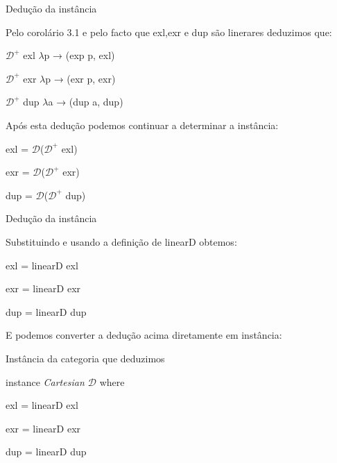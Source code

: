\documentclass{beamer}
\begin{document}
\begin{frame}{Dedução da instância}

Pelo corolário 3.1 e pelo facto que exl,exr e dup são linerares deduzimos que:

$\mathcal{D}^{+}$ exl $\lambda$p → (exp p, exl)

$\mathcal{D}^{+}$ exr $\lambda$p → (exr p, exr)

$\mathcal{D}^{+}$ dup $\lambda$a → (dup a, dup)

Após esta dedução podemos continuar a determinar a instância:

exl = $\mathcal{D}$($\mathcal{D}^{+}$ exl)

exr = $\mathcal{D}$($\mathcal{D}^{+}$ exr)

dup = $\mathcal{D}$($\mathcal{D}^{+}$ dup)

\end{frame}



\begin{frame}{Dedução da instância} 

Substituindo e usando a definição de linearD obtemos:

exl = linearD exl

exr = linearD exr

dup = linearD dup

E podemos converter a dedução acima diretamente em instância:

\begin{block}{Instância da categoria que deduzimos}

instance \textit{Cartesian $\mathcal{D}$} where

\hspace{0.2cm}exl = linearD exl

\hspace{0.2cm}exr = linearD exr

\hspace{0.2cm}dup = linearD dup

\end{block}

\end{frame}
\end{document}
